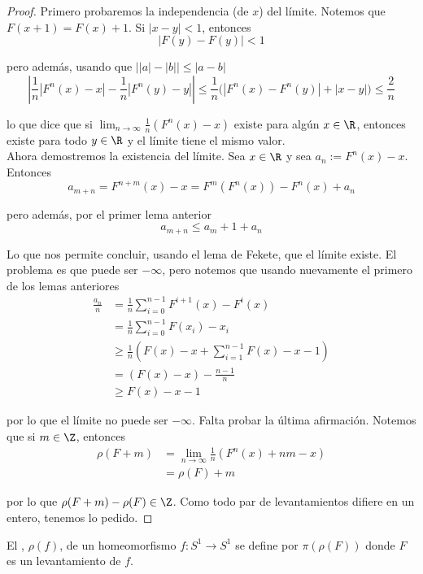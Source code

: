 \documentclass[	docname= Sistemas\ Din\'amicos,
				finished=1,
				semester=1,
				year=2017,
				professor=Godofredo\ Iommi,
				sigla=MAT2565]{apunte}
\begin{document}
\begin{proof} Primero probaremos la independencia (de $x$) del límite. Notemos que $F(x+1) = F(x) + 1$. Si $|x-y| < 1$, entonces
	$$|F(y) - F(y)| < 1$$

pero además, usando que $\big| |a| - |b| \big| \leq | a - b|$
	$$\left| \frac{1}{n} |F^{n}(x) - x| - \frac{1}{n} |F^{n}(y) - y| \right| \leq \frac{1}{n} \big(|F^{n}(x) - F^{n}(y)| + |x-y| \big) \leq \frac{2}{n}$$

lo que dice que si $\lim_{n \to \infty} \frac{1}{n} (F^{n}(x) - x)$ existe para algún $x \in \R$, entonces existe para todo $y \in \R$ y el límite tiene el mismo valor.	\\

Ahora demostremos la existencia del límite. Sea $x \in \R$ y sea $a_{n} := F^{n}(x) -x$. Entonces
	$$a_{m+n} = F^{n+m}(x) - x = F^{m}(F^{n}(x)) - F^{n}(x) + a_{n}$$

pero además, por el primer lema anterior
	$$a_{m+n} \leq a_{m} + 1 + a_{n}$$

Lo que nos permite concluir, usando el lema de Fekete, que el límite existe. El problema es que puede ser $-\infty$, pero notemos que usando nuevamente el primero de los lemas anteriores
	\begin{align*}
		\frac{a_{n}}{n}
			&=		\frac{1}{n} \sum_{i=0}^{n-1} F^{i+1}(x) - F^{i}(x)	\\
			&=		\frac{1}{n} \sum_{i=0}^{n-1} F(x_{i}) - x_{i}	\\
			&\geq	\frac{1}{n} \left(F(x) - x + \sum_{i=1}^{n-1} F(x) - x - 1\right)	\\
			&=		(F(x) - x) - \frac{n-1}{n}	\\
			&\geq	F(x) - x - 1  
	\end{align*}

por lo que el límite no puede ser $- \infty$. Falta probar la última afirmación.  Notemos que si $m \in \Z$, entonces
	\begin{align*}
		\rho(F+m)
			&=	\lim_{n \to \infty} \frac{1}{n} (F^{n}(x) + nm - x)	\\
			&=	\rho(F) + m
	\end{align*}

por lo que $\rho(F + m) - \rho(F) \in \Z$. Como todo par de levantamientos difiere en un entero, tenemos lo pedido.
	  
\end{proof}

\begin{defn} El , $\rho(f)$, de un homeomorfismo $f: S^{1} \to S^{1}$ se define por $\pi(\rho(F))$ donde $F$ es un levantamiento de $f$.
\end{defn}
\end{document}
